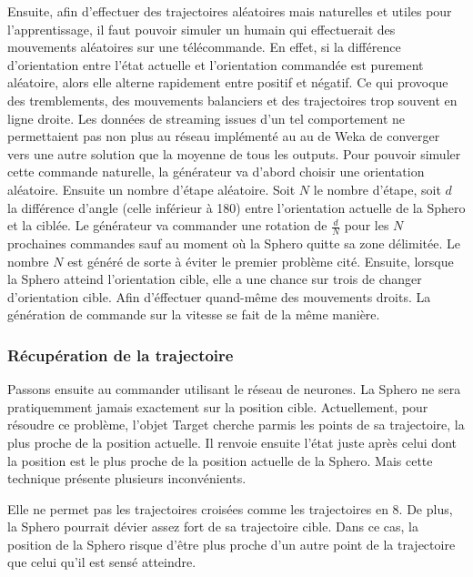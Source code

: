 Ensuite, afin d'effectuer des trajectoires aléatoires mais naturelles et utiles pour l'apprentissage, il faut pouvoir simuler un humain qui effectuerait des mouvements aléatoires sur une télécommande.
En effet, si la différence d'orientation entre l'état actuelle et l'orientation commandée est purement aléatoire, alors elle alterne rapidement entre positif et négatif.
Ce qui provoque des tremblements, des mouvements balanciers et des trajectoires trop souvent en ligne droite.
Les données de streaming issues d'un tel comportement ne permettaient pas non plus au réseau implémenté au au \mlp de Weka de converger vers une autre solution que la moyenne de tous les outputs.
Pour pouvoir simuler cette commande naturelle, la générateur va d'abord choisir une orientation aléatoire.
Ensuite un nombre d'étape aléatoire.
Soit $N$ le nombre d'étape, soit $d$ la différence d'angle (celle inférieur à 180) entre l'orientation actuelle de la Sphero et la ciblée.
Le générateur va commander une rotation de $\frac{d}{N}$ pour les $N$ prochaines commandes sauf au moment où la Sphero quitte sa zone délimitée.
Le nombre $N$ est généré de sorte à éviter le premier problème cité.
Ensuite, lorsque la Sphero atteind l'orientation cible, elle a une chance sur trois de changer d'orientation cible.
Afin d'éffectuer quand-même des mouvements droits.
La génération de commande sur la vitesse se fait de la même manière.

\subsubsection{Récupération de la trajectoire}
Passons ensuite au commander utilisant le réseau de neurones.
La Sphero ne sera pratiquemment jamais exactement sur la position cible.
Actuellement, pour résoudre ce problème, l'objet Target cherche parmis les points de sa trajectoire, la plus proche de la position actuelle.
Il renvoie ensuite l'état juste après celui dont la position est le plus proche de la position actuelle de la Sphero.
Mais cette technique présente plusieurs inconvénients.

Elle ne permet pas les trajectoires croisées comme les trajectoires en 8.
De plus, la Sphero pourrait dévier assez fort de sa trajectoire cible.
Dans ce cas, la position de la Sphero risque d'être plus proche d'un autre point de la trajectoire que celui qu'il est sensé atteindre.
